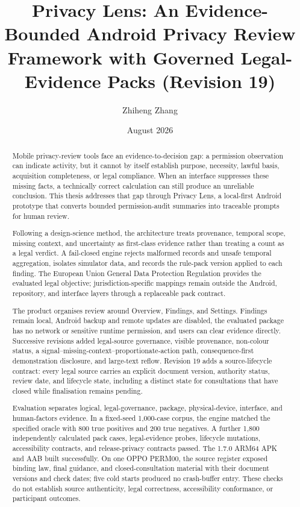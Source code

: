 \documentclass[11pt,a4paper]{article}
\title{Privacy Lens: An Evidence-Bounded Android Privacy Review Framework with Governed Legal-Evidence Packs (Revision 19)}
\author{Zhiheng Zhang}
\date{August 2026}
\begin{document}
\maketitle
\begin{abstract}
\small\singlespacing
Mobile privacy-review tools face an evidence-to-decision gap: a permission observation can indicate activity, but it cannot by itself establish purpose, necessity, lawful basis, acquisition completeness, or legal compliance. When an interface suppresses these missing facts, a technically correct calculation can still produce an unreliable conclusion. This thesis addresses that gap through Privacy Lens, a local-first Android prototype that converts bounded permission-audit summaries into traceable prompts for human review.

Following a design-science method, the architecture treats provenance, temporal scope, missing context, and uncertainty as first-class evidence rather than treating a count as a legal verdict. A fail-closed engine rejects malformed records and unsafe temporal aggregation, isolates simulator data, and records the rule-pack version applied to each finding. The European Union General Data Protection Regulation provides the evaluated legal objective; jurisdiction-specific mappings remain outside the Android, repository, and interface layers through a replaceable pack contract.

The product organises review around Overview, Findings, and Settings. Findings remain local, Android backup and remote updates are disabled, the evaluated package has no network or sensitive runtime permission, and users can clear evidence directly. Successive revisions added legal-source governance, visible provenance, non-colour status, a signal--missing-context--proportionate-action path, consequence-first demonstration disclosure, and large-text reflow. Revision 19 adds a source-lifecycle contract: every legal source carries an explicit document version, authority status, review date, and lifecycle state, including a distinct state for consultations that have closed while finalisation remains pending.

Evaluation separates logical, legal-governance, package, physical-device, interface, and human-factors evidence. In a fixed-seed 1,000-case corpus, the engine matched the specified oracle with 800 true positives and 200 true negatives. A further 1,800 independently calculated pack cases, legal-evidence probes, lifecycle mutations, accessibility contracts, and release-privacy contracts passed. The 1.7.0 ARM64 APK and AAB built successfully. On one OPPO PERM00, the source register exposed binding law, final guidance, and closed-consultation material with their document versions and check dates; five cold starts produced no crash-buffer entry. These checks do not establish source authenticity, legal correctness, accessibility conformance, or participant outcomes.


\end{abstract}
\end{document}
